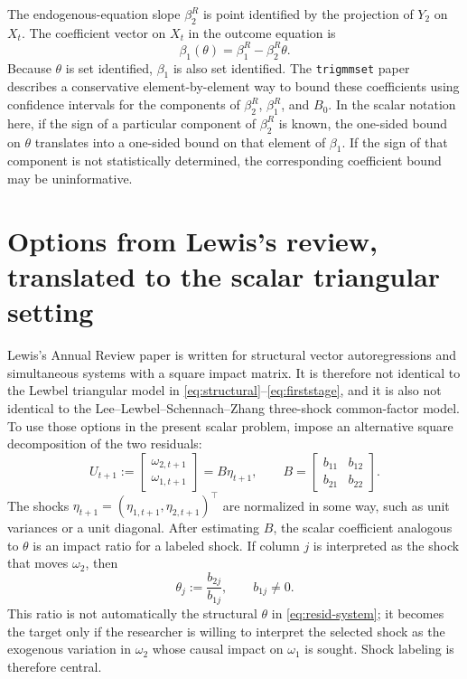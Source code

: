 \documentclass[11pt]{article}
\newcommand{\T}{\top}
\theoremstyle{plain}
\theoremstyle{definition}
\theoremstyle{remark}
\begin{document}
The endogenous-equation slope $\beta_2^R$ is point identified by the projection of
$Y_2$ on $X_t$. The coefficient vector on $X_t$ in the outcome equation is
\begin{equation}
\beta_1(\theta)=\beta_1^R-\beta_2^R\theta.
\label{eq:lsz-betarecovery}
\end{equation}
Because $\theta$ is set identified, $\beta_1$ is also set identified. The
\texttt{trigmmset} paper describes a conservative element-by-element way to bound
these coefficients using confidence intervals for the components of $\beta_2^R$,
$\beta_1^R$, and $B_0$. In the scalar notation here, if the sign of a particular
component of $\beta_2^R$ is known, the one-sided bound on $\theta$ translates into a
one-sided bound on that element of $\beta_1$. If the sign of that component is not
statistically determined, the corresponding coefficient bound may be
uninformative.

\section{Options from Lewis's review, translated to the scalar triangular setting}
\label{sec:lewis-options}

Lewis's Annual Review paper is written for structural vector autoregressions and
simultaneous systems with a square impact matrix. It is therefore not identical
to the Lewbel triangular model in \eqref{eq:structural}--\eqref{eq:firststage},
and it is also not identical to the Lee--Lewbel--Schennach--Zhang three-shock
common-factor model. To use those options in the present scalar problem, impose
an alternative square decomposition of the two residuals:
\begin{equation}
U_{t+1}:=\begin{bmatrix}\omega_{2,t+1}\\ \omega_{1,t+1}\end{bmatrix}
=B\eta_{t+1},
\qquad
B=\begin{bmatrix}b_{11}&b_{12}\\ b_{21}&b_{22}\end{bmatrix}.
\label{eq:square-B}
\end{equation}
The shocks $\eta_{t+1}=(\eta_{1,t+1},\eta_{2,t+1})^\T$ are normalized in some
way, such as unit variances or a unit diagonal. After estimating $B$, the scalar
coefficient analogous to $\theta$ is an impact ratio for a labeled shock. If
column $j$ is interpreted as the shock that moves $\omega_2$, then
\begin{equation}
\theta_j:=\frac{b_{2j}}{b_{1j}},
\qquad b_{1j}\ne0.
\label{eq:impact-ratio}
\end{equation}
This ratio is not automatically the structural $\theta$ in
\eqref{eq:resid-system}; it becomes the target only if the researcher is willing
to interpret the selected shock as the exogenous variation in $\omega_2$ whose causal
impact on $\omega_1$ is sought. Shock labeling is therefore central.
\end{document}
